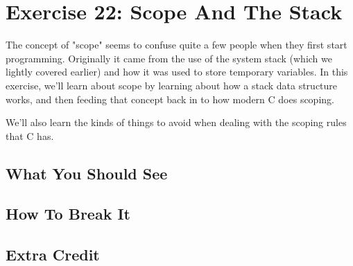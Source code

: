 \chapter{Exercise 22: Scope And The Stack}

The concept of "scope" seems to confuse quite a few people when they first
start programming.  Originally it came from the use of the system stack
(which we lightly covered earlier) and how it was used to store temporary
variables.  In this exercise, we'll learn about scope by learning about
how a stack data structure works, and then feeding that concept back in
to how modern C does scoping.

We'll also learn the kinds of things to avoid when dealing with the
scoping rules that C has.


\section{What You Should See}


\section{How To Break It}


\section{Extra Credit}

